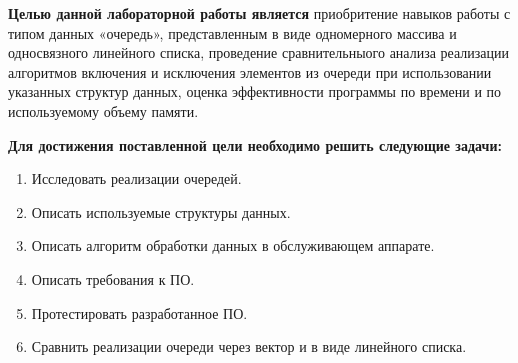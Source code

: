 \Introduction

\textbf{Целью данной лабораторной работы является} приобритение  навыков  работы  с  типом  данных  «очередь», представленным в виде одномерного массива и односвязного линейного списка, проведение сравнительныого анализа реализации алгоритмов включения и исключения  элементов из очереди при использовании указанных структур данных, оценка эффективности программы по времени и по используемому объему памяти.

\textbf{Для достижения поставленной цели необходимо решить следующие задачи:}

\begin{enumerate}
	\item Исследовать реализации очередей.
	\item Описать используемые структуры данных.
	\item Описать алгоритм обработки данных в обслуживающем аппарате.
	\item Описать требования к ПО.
	\item Протестировать разработанное ПО.
	\item Сравнить реализации очереди через вектор и в виде линейного списка.
\end{enumerate}